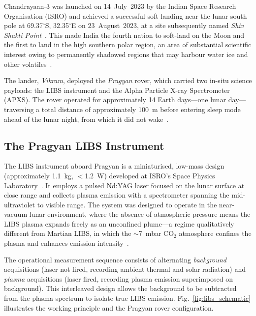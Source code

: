 \documentclass[a4paper,twocolumn,10pt]{article}
\begin{document}
Chandrayaan-3 was launched on 14~July~2023 by the Indian Space Research
Organisation (ISRO) and achieved a successful soft landing near the
lunar south pole at 69.37$^\circ$S, 32.35$^\circ$E on 23~August~2023,
at a site subsequently named \emph{Shiv Shakti Point}~\cite{ISROCh3}.
This made India the fourth nation to soft-land on the Moon and the
first to land in the high southern polar region, an area of
substantial scientific interest owing to permanently shadowed regions
that may harbour water ice and other volatiles~\cite{Colaprete2010,
Li2018}.

The lander, \emph{Vikram}, deployed the \emph{Pragyan} rover, which
carried two in-situ science payloads: the LIBS instrument and the
Alpha Particle X-ray Spectrometer (APXS).  The rover operated for
approximately 14 Earth days---one lunar day---traversing a total
distance of approximately 100~m before entering sleep mode ahead of
the lunar night, from which it did not wake~\cite{Saeidfirozeh2024}.

\subsection{The Pragyan LIBS Instrument}

The LIBS instrument aboard Pragyan is a miniaturised, low-mass design
(approximately 1.1~kg, $<$1.2~W) developed at ISRO's Space Physics
Laboratory~\cite{Laxmiprasad2020}.  It employs a pulsed Nd:YAG laser
focused on the lunar surface at close range and collects plasma
emission with a spectrometer spanning the mid-ultraviolet to visible
range.  The system was designed to operate in the near-vacuum lunar
environment, where the absence of atmospheric pressure means the LIBS
plasma expands freely as an unconfined plume---a regime qualitatively
different from Martian LIBS, in which the $\sim$7~mbar CO$_2$
atmosphere confines the plasma and enhances emission
intensity~\cite{Knight2000,Saeidfirozeh2024}.

The operational measurement sequence consists of alternating
\emph{background} acquisitions (laser not fired, recording ambient
thermal and solar radiation) and \emph{plasma} acquisitions (laser
fired, recording plasma emission superimposed on background).  This
interleaved design allows the background to be subtracted from the
plasma spectrum to isolate true LIBS emission.
Fig.~\ref{fig:libs_schematic} illustrates the working principle and
the Pragyan rover configuration.
\end{document}
